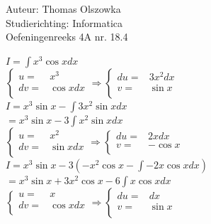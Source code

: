 \documentclass[a4paper]{article}
\newcommand{\dint}{\displaystyle\int}
\begin{document}
\noindent \large Auteur: Thomas Olszowka \\
\noindent \large Studierichting: Informatica \\
\noindent \large Oefeningenreeks 4A nr. 18.4  \\



\medskip

\normalsize

$I = \dint x^3 \cos x dx$ \\

$\left\{\begin{array}{cc}
    u =& x^3 \\ 
    dv =& \cos x dx \\ 
\end{array}\right. \Rightarrow\left\{\begin{array}{cc}
    du =& 3x^2 dx \\
    v =& \sin x \\
\end{array}\right.$ \\

$I = x^3 \sin x - \dint 3x^2 \sin x dx $ \\

$= x^3 \sin x - 3 \dint x^2 \sin x dx$ \\

$\left\{\begin{array}{cc}
    u =& x^2 \\ 
    dv =& \sin x dx \\ 
\end{array}\right. \Rightarrow\left\{\begin{array}{cc}
    du =& 2x dx \\
    v =& -\cos x \\
\end{array}\right.$ \\

$I = x^3 \sin x - 3 \left( -x^2 \cos x - \dint -2x \cos x dx\right)$ \\

$= x^3 \sin x + 3x^2 \cos x - 6\dint x \cos x dx$ \\

$\left\{\begin{array}{cc}
    u =& x \\ 
    dv =& \cos x dx \\ 
\end{array}\right. \Rightarrow\left\{\begin{array}{cc}
    du =& dx \\
    v =& \sin x \\
\end{array}\right.$ \\
\end{document}
